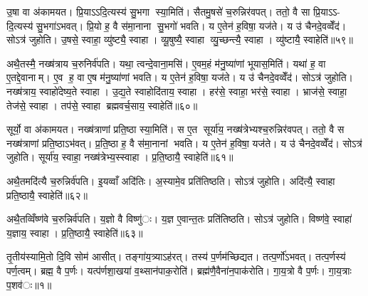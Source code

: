 उ॒षा वा अ॑कामयत। प्रि॒याऽऽदि॒त्यस्य॑ सु॒भगा स्या॒मिति॑। सैतमु॒षसे॑ च॒रुन्निर॑वपत्। ततो॒ वै सा प्रि॒याऽऽ- दि॒त्यस्य॑ सु॒भगा॑ऽभवत्। प्रि॒यो ह॒ वै स॑मा॒नाना सु॒भगो॑ भवति। य ए॒तेन॑ ह॒विषा॒ यज॑ते। य उ॑ चैनदे॒वव्वेँद॑। सोऽत्र॑ जुहोति। उ॒षसे॒ स्वाहा॒ व्यु॑ष्ट्यै॒ स्वाहा। व्यू॒षुष्यै॒ स्वाहा व्यु॒च्छन्त्यै॒ स्वाहा। व्यु॑ष्टायै॒ स्वाहेति॑॥५९॥

अथै॒तस्मै॒ नख्ष॑त्राय च॒रुनिर्व॑पति। यथा॒ त्वन्दे॒वाना॒मसि॑। ए॒वम॒हं म॑नु॒ष्या॑णां भूयास॒मिति॑। यथा॑ ह॒ वा ए॒तद्दे॒वानाम्। ए॒व ह॒ वा ए॒ष म॑नु॒ष्या॑णां भवति। य ए॒तेन॑ ह॒विषा॒ यज॑ते। य उ॑ चैनदे॒वव्वेँद॑। सोऽत्र॑ जुहोति। नख्ष॑त्राय॒ स्वाहो॑देष्य॒ते स्वाहा। उ॒द्य॒ते स्वाहोदि॑ताय॒ स्वाहा। हर॑से॒ स्वाहा॒ भर॑से॒ स्वाहा। भ्राज॑से॒ स्वाहा॒ तेज॑से॒ स्वाहा। तप॑से॒ स्वाहा ब्रह्मवर्च॒साय॒ स्वाहेति॑॥६०॥

सूर्यो॒ वा अ॑कामयत। नख्ष॑त्राणां प्रति॒ष्ठा स्या॒मिति॑। स ए॒त सूर्या॑य॒ नख्ष॑त्रेभ्यश्च॒रुन्निर॑वपत्। ततो॒ वै स नख्ष॑त्राणां प्रति॒ष्ठाऽभ॑वत्। प्र॒ति॒ष्ठा ह॒ वै स॑मा॒नानां भवति। य ए॒तेन॑ ह॒विषा॒ यज॑ते। य उ॑ चैनदे॒वव्वेँद॑। सोऽत्र॑ जुहोति। सूर्या॑य॒ स्वाहा॒ नख्ष॑त्रेभ्य॒स्स्वाहा। प्र॒ति॒ष्ठायै॒ स्वाहेति॑॥६१॥

अथै॒तमदि॑त्यै च॒रुन्निर्व॑पति। इ॒यव्वाँ अदि॑तिः। अ॒स्यामे॒व प्रति॑तिष्ठति। सोऽत्र॑ जुहोति। अदि॑त्यै॒ स्वाहा प्रति॒ष्ठायै॒ स्वाहेति॑॥६२॥

अथै॒तव्विँष्ण॑वे च॒रुन्निर्व॑पति। य॒ज्ञो वै विष्णु॑ः। य॒ज्ञ ए॒वान्त॒तः प्रति॑तिष्ठति। सोऽत्र॑ जुहोति। विष्ण॑वे॒ स्वाहा॑ य॒ज्ञाय॒ स्वाहा। प्र॒ति॒ष्ठायै॒ स्वाहेति॑॥६३॥




तृ॒तीय॑स्यामि॒तो दि॒वि सोम॑ आसीत्। तङ्गा॑य॒त्र्याऽह॑रत्। तस्य॑ प॒र्णम॑च्छिद्यत। तत्प॒र्णो॑ऽभवत्। तत्प॒र्णस्य॑ पर्ण॒त्वम्। ब्रह्म॒ वै प॒र्णः। यत्प॑र्णशा॒खया॑ व॒थ्सान॑पाक॒रोति॑। ब्रह्म॑णै॒वैना॑न॒पाक॑रोति। गा॒य॒त्रो वै प॒र्णः। गा॒य॒त्राः प॒शव॑ः॥१॥

